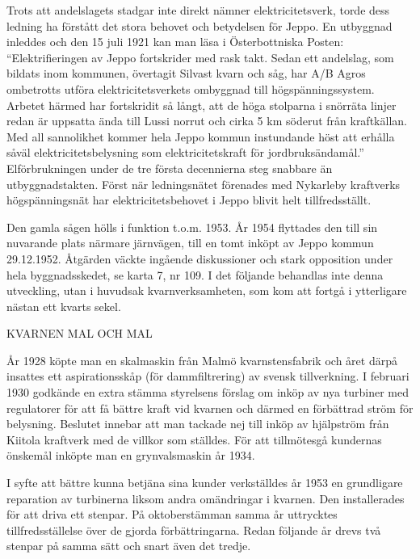 Trots att andelslagets stadgar inte direkt nämner elektricitetsverk, torde dess ledning ha förstått det stora behovet och betydelsen för Jeppo. En utbyggnad inleddes och den 15 juli 1921 kan man läsa i Österbottniska Posten: ``Elektrifieringen av Jeppo fortskrider med rask takt. Sedan ett andelslag, som bildats inom kommunen, övertagit Silvast kvarn och såg, har A/B Agros ombetrotts utföra elektricitetsverkets ombyggnad till högspänningssystem. Arbetet härmed har fortskridit så långt, att de höga stolparna i snörräta linjer redan är uppsatta ända till Lussi norrut och cirka 5 km söderut från kraftkällan. Med all sannolikhet kommer hela Jeppo kommun instundande höst att erhålla såväl elektricitetsbelysning som elektricitetskraft för jordbruksändamål.''  Elförbrukningen under de tre första decennierna steg snabbare än utbyggnadstakten. Först när ledningsnätet förenades med Nykarleby kraftverks högspänningsnät har elektricitetsbehovet i Jeppo blivit helt tillfredsställt.

Den gamla sågen hölls i funktion t.o.m. 1953. År 1954 flyttades den till sin nuvarande plats närmare järnvägen, till en tomt inköpt av Jeppo kommun 29.12.1952. Åtgärden väckte ingående diskussioner och stark opposition under hela byggnadsskedet, se karta 7, nr 109. I det följande behandlas inte denna utveckling, utan i huvudsak kvarnverksamheten, som kom att fortgå i ytterligare nästan ett kvarts sekel.



KVARNEN MAL OCH MAL

År 1928 köpte man en skalmaskin från Malmö kvarnstensfabrik och året därpå insattes ett aspirationsskåp (för dammfiltrering) av svensk tillverkning. I februari 1930 godkände en extra stämma styrelsens förslag om inköp av nya turbiner med regulatorer för att få bättre kraft vid kvarnen och därmed en förbättrad ström för belysning. Beslutet innebar att man tackade nej till inköp av hjälpström från Kiitola kraftverk med de villkor som ställdes. För att tillmötesgå kundernas önskemål inköpte man en grynvalsmaskin år 1934.

I syfte att bättre kunna betjäna sina kunder verkställdes år 1953 en grundligare reparation av turbinerna liksom andra omändringar i kvarnen. Den  installerades för att driva ett stenpar. På oktoberstämman samma år uttrycktes tillfredsställelse över de gjorda förbättringarna. Redan följande år drevs två stenpar på samma sätt och snart även det tredje.

